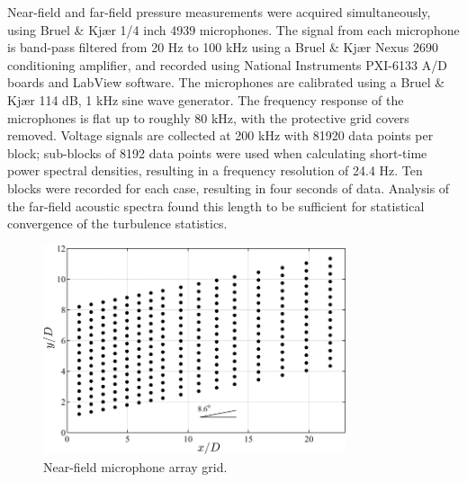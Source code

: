 \documentclass[english]{aiaa-tc}
\begin{document}
Near-field and far-field pressure measurements were acquired simultaneously, using Bruel \& Kj{\ae}r 1/4 inch 4939 microphones.
The signal from each microphone is band-pass filtered from 20 Hz to 100 kHz using a Bruel \& Kj{\ae}r Nexus 2690 conditioning amplifier, and recorded using National Instruments PXI-6133 A/D boards and LabView software.
The microphones are calibrated using a Bruel \& Kj{\ae}r  114 dB, 1 kHz sine wave generator.
The frequency response of the microphones is flat up to roughly 80 kHz, with the protective grid covers removed.
Voltage signals are collected at 200 kHz with 81920 data points per block; sub-blocks of 8192 data points were used when calculating short-time power spectral densities, resulting in a frequency resolution of 24.4 Hz.
Ten blocks were recorded for each case, resulting in four seconds of data. Analysis of the far-field acoustic spectra found this length to be sufficient for statistical convergence of the turbulence statistics.
\begin{figure}
	\begin{center}
		\includegraphics[width=3.5in]{GDTL_mic_locations.png}
		\caption{Near-field microphone array grid.}\label{mic_grid}
	\end{center}
\end{figure}
\end{document}
